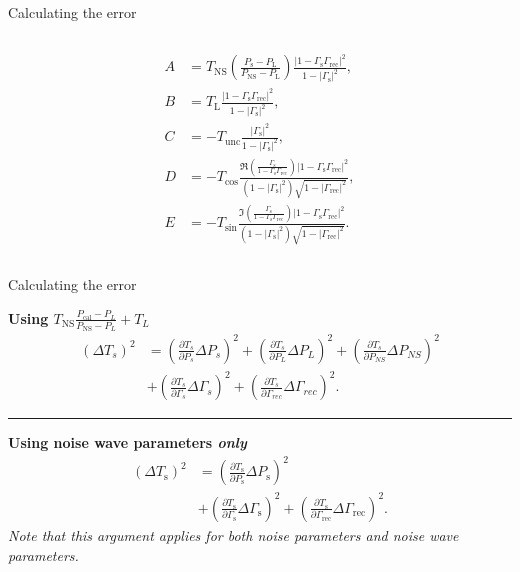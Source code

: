 \documentclass[aspectratio=169]{beamer}
\begin{document}
\begin{frame}{\small{Calculating the error}}
\begin{columns}[c]
		\begin{column}{0.6\textwidth}
			{\tiny
				\begin{align}
					A & = T_\mathrm{NS}\left(\frac{P_\mathrm{s} - P_\mathrm{L}}{P_\mathrm{NS}-P_\mathrm{L}}\right)\frac{\left|1-\Gamma_\mathrm{s}\Gamma_\mathrm{rec}\right|^2}{ 1-|\Gamma_\mathrm{s}|^2},                                               \\
					B & = T_\mathrm{L}\frac{\left|1-\Gamma_\mathrm{s}\Gamma_\mathrm{rec}\right|^2}{ 1-|\Gamma_\mathrm{s}|^2},                                                                                                                           \\
					C & = - T_\mathrm{unc} \frac{ |\Gamma_\mathrm{s}|^2}{1-\left|\Gamma_\mathrm{s}\right|^2},                                                                                                                                           \\
					D & = -T_\mathrm{cos} \frac{\Re \left( \frac{ \Gamma_\mathrm{s}}{1-\Gamma_\mathrm{s}\Gamma_\mathrm{rec}}\right)\left|1-\Gamma_\mathrm{s}\Gamma_\mathrm{rec}\right|^2}{( 1-|\Gamma_\mathrm{s}|^2) \sqrt{1-|\Gamma_\mathrm{rec}|^2}}, \\
					E & = -T_\mathrm{sin} \frac{\Im \left( \frac{ \Gamma_\mathrm{s}}{1-\Gamma_\mathrm{s}\Gamma_\mathrm{rec}}\right)\left|1-\Gamma_\mathrm{s}\Gamma_\mathrm{rec}\right|^2}{( 1-|\Gamma_\mathrm{s}|^2) \sqrt{1-|\Gamma_\mathrm{rec}|^2}}.
				\end{align}
			}
		\end{column}
	\end{columns}
\end{frame}

\begin{frame}{\small{Calculating the error}}

	\textbf{Using $T_{\text{NS}} \frac{P_{\text{cal}} - P_L}{P_{\text{NS}} - P_L} + T_L$}
	\begin{align}
		(\Delta T_s)^2 & = \left(\frac{\partial T_s}{\partial P_s} \Delta P_s\right)^2 + \left(\frac{\partial T_s}{\partial P_L} \Delta P_L\right)^2 + \left(\frac{\partial T_s}{\partial P_{NS}} \Delta P_{NS}\right)^2 \\ &+ \left(\frac{\partial T_s}{\partial \Gamma_s} \Delta \Gamma_s\right)^2 + \left(\frac{\partial T_s}{\partial \Gamma_{rec}} \Delta \Gamma_{rec}\right)^2.
	\end{align}

	\hrule
	\textbf{Using noise wave parameters \textit{only}}
	\begin{align}
		(\Delta T_\mathrm{s})^2 & = \left(\frac{\partial T_\mathrm{s}}{\partial P_\mathrm{s}} \Delta P_\mathrm{s}\right)^2 \\ &+ \left(\frac{\partial T_\mathrm{s}}{\partial \Gamma_\mathrm{s}} \Delta \Gamma_\mathrm{s}\right)^2 + \left(\frac{\partial T_\mathrm{s}}{\partial \Gamma_\mathrm{rec}} \Delta \Gamma_\mathrm{rec}\right)^2.
	\end{align}
	\textit{Note that this argument applies for both noise parameters and noise wave parameters.}

\end{frame}
\end{document}
